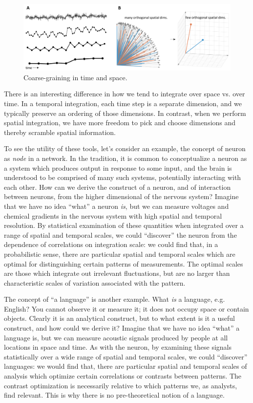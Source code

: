   
\begin{figure}
\includegraphics[width=\textwidth]{figures/Tilsen-img171.png}
\caption{Coarse-graining in time and space.}
\label{fig:8:5}
\end{figure}
 

  There is an interesting difference in how we tend to integrate over space vs. over time. In a temporal integration, each time step is a separate dimension, and we typically preserve an ordering of those dimensions. In contrast, when we perform spatial integration, we have more freedom to pick and choose dimensions and thereby scramble spatial information.

To see the utility of these tools, let's consider an example, the concept of neuron as \textit{node} in a network. In the  tradition, it is common to conceptualize a neuron as a system which produces output in response to some input, and the brain is understood to be comprised of many such systems, potentially interacting with each other. How can we derive the construct of a neuron, and of interaction between neurons, from the higher dimensional  of the nervous system? Imagine that we have no idea “what” a neuron \textit{is}, but we can measure voltages and chemical gradients in the nervous system with high spatial and temporal resolution. By statistical examination of these quantities when integrated over a range of spatial and temporal scales, we could “discover” the neuron from the dependence of correlations on integration scale: we could find that, in a probabilistic sense, there are particular spatial and temporal scales which are optimal for distinguishing certain patterns of measurements. The optimal scales are those which integrate out irrelevant fluctuations, but are no larger than characteristic scales of variation associated with the pattern.

  The concept of “a language” is another example. What \textit{is} a language, e.g. English? You cannot observe it or measure it; it does not occupy space or contain objects. Clearly it is an analytical construct, but to what extent is it a useful construct, and how could we derive it? Imagine that we have no idea “what” a language is, but we can measure acoustic signals produced by people at all locations in space and time. As with the neuron, by examining these signals statistically over a wide range of spatial and temporal scales, we could “discover” languages: we would find that, there are particular spatial and temporal scales of analysis which optimize certain correlations or contrasts between patterns. The contrast optimization is necessarily relative to which patterns we, as analysts, find relevant. This is why there is no pre-theoretical notion of a language.

